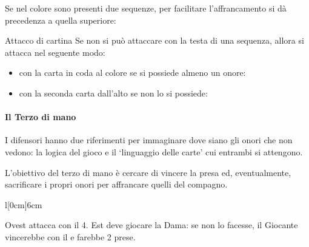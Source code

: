\documentclass[../corsofiori.tex]{subfiles}
\begin{document}
Se nel colore sono presenti due sequenze, per facilitare l'affrancamento si dà precedenza a quella superiore:

\qquad{}

\begin{regola}{Attacco di cartina}
    Se non si può attaccare con la testa di una sequenza, allora si attacca nel seguente modo:
\begin{itemize}
    \item con la carta in coda al colore se si possiede almeno un onore:

        \qquad
        \qquad

    \item con la seconda carta dall'alto se non lo si possiede:

        \qquad
\end{itemize}
\end{regola}

\paragraph{Il Terzo di mano} I difensori hanno due riferimenti per immaginare dove siano gli onori che non vedono: la
logica del gioco e il `linguaggio delle carte' cui entrambi si attengono.

L'obiettivo del terzo di mano è cercare di vincere la presa ed, eventualmente, sacrificare i propri onori per affrancare
quelli del compagno.

\begin{wraptable}[6]{l}[0cm]{6cm}

    \vspace{-.5cm}

    \hspace{1cm}

    \bigskip

    \hspace{1.375cm}
\end{wraptable}
\bigskip

Ovest attacca con il 4. Est deve giocare la Dama: se non lo facesse, il Giocante vincerebbe con il \Ten e farebbe 2
prese.
\vspace{.7cm}
\end{document}
